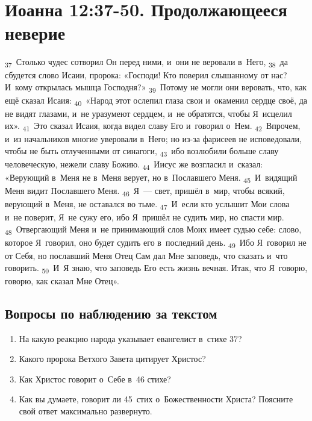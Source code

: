 \documentclass[a4paper,12pt]{article}
\begin{document}

\section{Иоанна 12:37-50. Продолжающееся неверие}

\textsubscript{37}~Столько чудес сотворил Он перед ними, и~они не веровали в~Него,
\textsubscript{38}~да сбудется слово Исаии, пророка: «Господи! Кто поверил слышанному от нас? И~кому открылась мышца Господня?»
\textsubscript{39}~Потому не могли они веровать, что, как ещё сказал Исаия:
\textsubscript{40}~«Народ этот ослепил глаза свои и~окаменил сердце своё, да не видят глазами, и~не уразумеют сердцем, и~не обратятся, чтобы Я~исцелил их».
\textsubscript{41}~Это сказал Исаия, когда видел славу Его и~говорил о~Нем.
\textsubscript{42}~Впрочем, и~из начальников многие уверовали в~Него; но из-за фарисеев не исповедовали, чтобы не быть отлученными от синагоги,
\textsubscript{43}~ибо возлюбили больше славу человеческую, нежели славу Божию.
\textsubscript{44}~Иисус же возгласил и~сказал: «Верующий в~Меня не в~Меня верует, но в~Пославшего Меня.
\textsubscript{45}~И~видящий Меня видит Пославшего Меня.
\textsubscript{46}~Я~— свет, пришёл в~мир, чтобы всякий, верующий в~Меня, не оставался во тьме.
\textsubscript{47}~И~если кто услышит Мои слова и~не поверит, Я~не сужу его, ибо Я~пришёл не судить мир, но спасти мир.
\textsubscript{48}~Отвергающий Меня и~не принимающий слов Моих имеет судью себе: слово, которое Я~говорил, оно будет судить его в~последний день.
\textsubscript{49}~Ибо Я~говорил не от Себя, но пославший Меня Отец Сам дал Мне заповедь, что сказать и~что говорить.
\textsubscript{50}~И~Я знаю, что заповедь Его есть жизнь вечная. Итак, что Я~говорю, говорю, как сказал Мне Отец». 

\subsection*{Вопросы по наблюдению за текстом}
\begin{enumerate}
    \item На какую реакцию народа указывает евангелист в~стихе 37? 
    
    \myline
    
    \myline
    \item Какого пророка Ветхого Завета цитирует Христос? 
    
    \myline
    
    \myline
    \item Как Христос говорит о~Себе в~46 стихе? 
    
    \myline
    
    \myline
    \item Как вы думаете, говорит ли 45~стих о~Божественности Христа? Поясните свой ответ максимально развернуто. 
    
    \myline
    
    \myline
\end{enumerate}
\end{document}
